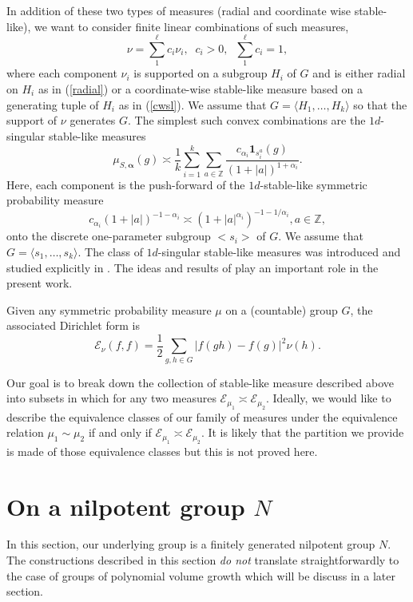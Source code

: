 \documentclass[pdflatex,sn-mathphys-num]{sn-jnl}%
\theoremstyle{thmstyleone}%
\theoremstyle{thmstyletwo}%
\theoremstyle{thmstylethree}%
\begin{document}
In addition of these two types of measures (radial and coordinate wise stable-like), we want to consider finite linear combinations of such measures, $$\nu=\sum_1^\ell c_i\nu_i, \;\;c_i>0,\;\; \sum_1^\ell c_i=1,$$ where each component $\nu_i$ is supported on  a subgroup $H_i$ of $G$ and is either radial on $H_i$ as in (\ref{radial}) or a coordinate-wise stable-like measure based on a generating tuple of $H_i$ as in (\ref{cwsl}). We assume that $G=\langle H_1,\dots, H_k\rangle$ so that the support of $\nu$ generates $G$. The simplest such convex combinations are the $1d$-singular stable-like measures
\begin{equation}\label{1d}\mu_{S,\bm{\alpha}}(g) \asymp \frac{1}{k}\sum_{i=1}^k \sum_{a\in \mathbb{Z}} \frac{c_{\alpha_i}\mathbf 1_{ s_i^a}(g)}{(1+|a|)^{1+\alpha_i}}.    
\end{equation}
Here, each component is the push-forward of the $1d$-stable-like symmetric probability measure 
$$c_{\alpha_i}(1+|a|)^{-1-\alpha_i} \asymp (1+|a|^{\alpha_i})^{-1-1/\alpha_i}, a\in \mathbb Z,$$ onto the discrete one-parameter subgroup $<s_i>$ of $ G$. We assume that $G=\langle s_1,\dots, s_k\rangle$. The class of $1d$-singular stable-like measures was introduced and studied explicitly in \cite{SCZ-nil}. The ideas and results of \cite{SCZ-nil} play an important role in the present work.

Given any symmetric probability measure $\mu$ on a (countable) group $G$, the associated Dirichlet form is
$$\mathcal E_\nu (f,f)=\frac{1}{2}\sum_{g,h\in G}|f(gh)-f(g)|^2\nu(h).$$

Our goal is to break down the collection of stable-like measure described above into subsets in which for any two measures $\mathcal E_{\mu_1}\asymp \mathcal E_{\mu_2}$. Ideally, we would like to describe the equivalence classes of our family of measures under the equivalence relation $\mu_1\sim \mu_2$ if and only if $\mathcal E_{\mu_1}\asymp \mathcal E_{\mu_2}$. It is likely that the partition we provide is made of those equivalence classes but this is not proved here.

\section{On a nilpotent group $N$}

In this section, our underlying group is a finitely generated nilpotent group $N$. The constructions described in this section {\em do not} translate straightforwardly to the case of groups of polynomial volume growth which will be discuss in a later section.
\end{document}
